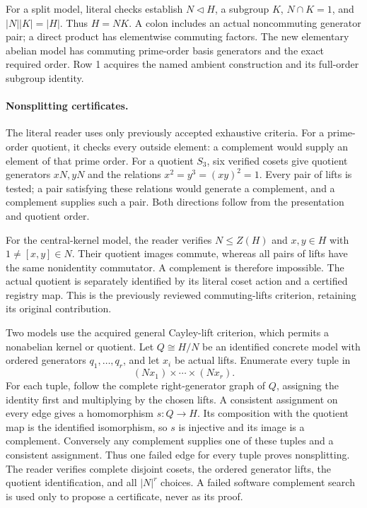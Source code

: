 \documentclass[11pt]{article}
\begin{document}
For a split model, literal checks establish $N\triangleleft H$, a subgroup
$K$, $N\cap K=1$, and $|N||K|=|H|$. Thus $H=NK$. A colon includes an
actual noncommuting generator pair; a direct product has elementwise
commuting factors. The new elementary abelian model has commuting
prime-order basis generators and the exact required order. Row 1 acquires
the named ambient construction and its full-order subgroup identity.

\newpage
\paragraph{Nonsplitting certificates.}
The literal reader uses only previously accepted exhaustive criteria.
For a prime-order quotient, it checks every outside element: a complement
would supply an element of that prime order. For a quotient $S_3$, six
verified cosets give quotient generators $xN,yN$ and the relations
$x^2=y^3=(xy)^2=1$. Every pair of lifts is tested; a pair satisfying these
relations would generate a complement, and a complement supplies such a
pair. Both directions follow from the presentation and quotient order.

For the central-kernel model, the reader verifies $N\leq Z(H)$ and
$x,y\in H$ with $1\ne[x,y]\in N$. Their quotient images commute, whereas
all pairs of lifts have the same nonidentity commutator. A complement is
therefore impossible. The actual quotient is separately identified by its
literal coset action and a certified registry map. This is the previously
reviewed commuting-lifts criterion, retaining its original contribution.

Two models use the acquired general Cayley-lift criterion, which permits
a nonabelian kernel or quotient. Let $Q\cong H/N$ be an identified concrete
model with ordered generators $q_1,\ldots,q_r$, and let $x_i$ be actual
lifts. Enumerate every tuple in
\[
 (Nx_1)\times\cdots\times(Nx_r).
\]
For each tuple, follow the complete right-generator graph of $Q$, assigning
the identity first and multiplying by the chosen lifts. A consistent
assignment on every edge gives a homomorphism $s:Q\to H$. Its composition
with the quotient map is the identified isomorphism, so $s$ is injective
and its image is a complement. Conversely any complement supplies one
of these tuples and a consistent assignment. Thus one failed edge for
every tuple proves nonsplitting. The reader verifies complete disjoint
cosets, the ordered generator lifts, the quotient identification, and
all $|N|^r$ choices. A failed software complement search is used only to
propose a certificate, never as its proof.
\end{document}

